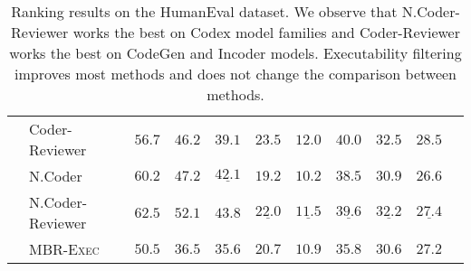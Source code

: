 \documentclass[nohyperref]{article}
\theoremstyle{plain}
\theoremstyle{definition}
\theoremstyle{remark}
\begin{document}
\begin{table*}[]
\begin{tabular}{l|lccccccccc}
    & Coder-Reviewer &              $56.7$ &              $46.2$ &              $39.1$ &     $\mathbf{23.5}$ &     $\mathbf{12.0}$ &     $\mathbf{40.0}$ &     $\mathbf{32.5}$ &     $\mathbf{28.5}$ \\
\cmidrule{2-10}
    & N.Coder &              $60.2$ &              $47.2$ &  $\underline{42.1}$ &              $19.2$ &              $10.2$ &              $38.5$ &              $30.9$ &              $26.6$ \\
    & N.Coder-Reviewer &     $\mathbf{62.5}$ &     $\mathbf{52.1}$ &     $\mathbf{43.8}$ &  $\underline{22.0}$ &  $\underline{11.5}$ &  $\underline{39.6}$ &  $\underline{32.2}$ &  $\underline{27.4}$ \\
\cmidrule{2-10}
    & MBR-\textsc{Exec} &              $50.5$ &              $36.5$ &              $35.6$ &              $20.7$ &              $10.9$ &              $35.8$ &              $30.6$ &              $27.2$ \\
\bottomrule
\end{tabular}
 \caption{
Ranking results on the HumanEval dataset. We observe that N.Coder-Reviewer works the best on Codex model families and Coder-Reviewer works the best on CodeGen and Incoder models. Executability filtering improves most methods and does not change the comparison between methods.
}
\label{tab:app_humaneval_exec}
\end{table*}
\end{document}
